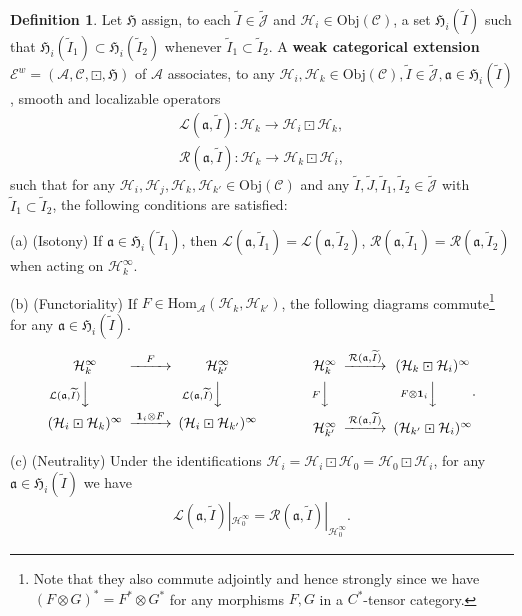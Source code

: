 \documentclass[12pt,a4paper]{article}
\theoremstyle{definition}
\newtheorem{df}{Definition}[subsection]
\theoremstyle{plain}
\newcommand{\fk}{\mathfrak}
\newcommand{\mc}{\mathcal}
\newcommand{\wtd}{\widetilde}
\newcommand{\id}{\mathbf{1}}
\newcommand{\Hom}{\mathrm{Hom}}
\newcommand{\scr}{\mathscr}
\newcommand{\Jtd}{\widetilde{\mathcal J}}
\newcommand{\Obj}{\mathrm{Obj}}
\numberwithin{equation}{subsection}
\begin{document}
\begin{df}\label{lb30}
Let $\fk H$ assign, to each $\wtd I\in\Jtd$ and $\mc H_i\in\Obj(\scr C)$, a set $\fk H_i(\wtd I)$  such that $\fk H_i(\wtd I_1)\subset\fk H_i(\wtd I_2)$  whenever $\wtd I_1\subset\wtd I_2$. A \textbf{weak categorical extension} $\scr E^w=(\mc A,\scr C,\boxdot,\fk H)$ of $\mc A$ associates, to any $\mc H_i,\mc H_k\in\Obj(\scr C),\wtd I\in\Jtd,\fk a\in\fk H_i(\wtd I)$, smooth and localizable operators
\begin{gather*}	
\mc L(\fk a,\wtd I):\mc H_k\rightarrow\mc H_i\boxdot\mc H_k,\\
\mc R(\fk a,\wtd I):\mc H_k\rightarrow\mc H_k\boxdot\mc H_i,
\end{gather*}
such that for any $\mc H_i,\mc H_j,\mc H_k,\mc H_{k'}\in\Obj(\scr C)$ and any $\wtd I,\wtd J,\wtd I_1,\wtd I_2\in\Jtd$ with $\wtd I_1\subset\wtd I_2$, the following conditions are satisfied:

	(a) (Isotony) If  $\fk a\in\fk H_i(\wtd I_1)$, then $\mc L(\fk a,\wtd I_1)=\mc L(\fk a,\wtd I_2)$, $\mc R(\fk a,\wtd I_1)=\mc R(\fk a,\wtd I_2)$ when acting on $\mc H_k^\infty$.
	
	(b) (Functoriality) If  $F\in\Hom_{\mc A}(\mc H_k,\mc H_{k'})$,  the following diagrams commute\footnote{Note that they also commute adjointly and hence strongly since we have $(F\otimes G)^*=F^*\otimes G^*$ for any morphisms $F,G$ in a $C^*$-tensor category.}   for any $\fk a\in\fk H_i(\wtd I)$.
	\begin{gather}
	\begin{CD}
	\mc H_k^\infty @>F>> \mc H_{k'}^\infty\\
	@V \mc L(\fk a,\wtd I)  VV @V \mc L(\fk a,\wtd I)  VV\\
	(\mc H_i\boxdot\mc H_k)^\infty @> \id_i\otimes F>> (\mc H_i\boxdot\mc H_{k'})^\infty
	\end{CD}\qquad\qquad
	\begin{CD}
	\mc H_k^\infty @> \mc R(\fk a,\wtd I)  >> (\mc H_k\boxdot\mc H_i)^\infty\\
	@V F VV @V F\otimes\id_i  VV\\
	\mc H_{k'}^\infty @>\mc R(\fk a,\wtd I) >> (\mc H_{k'}\boxdot\mc H_i)^\infty
	\end{CD}.
	\end{gather}
	
	(c) (Neutrality) Under the identifications $\mc H_i=\mc H_i\boxdot\mc H_0=\mc H_0\boxdot\mc H_i$, for any $\fk a\in\fk H_i(\wtd I)$ we have
	\begin{align}
	\mc L(\fk a,\wtd I)|_{\mc H_0^\infty}=\mc R(\fk a,\wtd I)|_{\mc H_0^\infty}.	
	\end{align}
	

\end{df}
\end{document}
